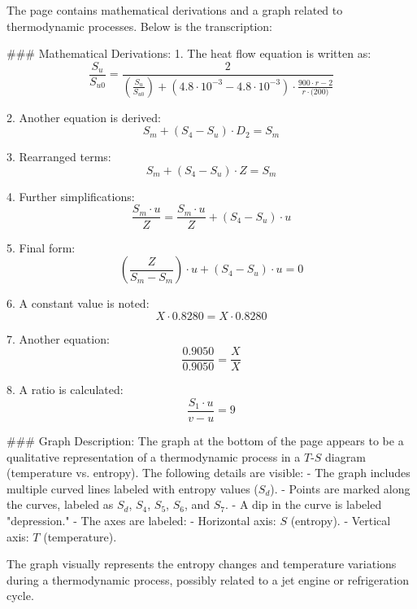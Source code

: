 The page contains mathematical derivations and a graph related to thermodynamic processes. Below is the transcription:

### Mathematical Derivations:
1. The heat flow equation is written as:
   \[
   \frac{S_u}{S_{u0}} = \frac{2}{\left(\frac{S_u}{S_{u0}}\right) + (4.8 \cdot 10^{-3} - 4.8 \cdot 10^{-3}) \cdot \frac{900 \cdot r - 2}{r \cdot \text{(200)}}}
   \]

2. Another equation is derived:
   \[
   S_m + (S_4 - S_u) \cdot D_2 = S_m
   \]

3. Rearranged terms:
   \[
   S_m + (S_4 - S_u) \cdot Z = S_m
   \]

4. Further simplifications:
   \[
   \frac{S_m \cdot u}{Z} = \frac{S_m \cdot u}{Z} + (S_4 - S_u) \cdot u
   \]

5. Final form:
   \[
   \left(\frac{Z}{S_m - S_m}\right) \cdot u + (S_4 - S_u) \cdot u = 0
   \]

6. A constant value is noted:
   \[
   X \cdot 0.8280 = X \cdot 0.8280
   \]

7. Another equation:
   \[
   \frac{0.9050}{0.9050} = \frac{X}{X}
   \]

8. A ratio is calculated:
   \[
   \frac{S_1 \cdot u}{v - u} = 9
   \]

### Graph Description:
The graph at the bottom of the page appears to be a qualitative representation of a thermodynamic process in a \( T \)-\( S \) diagram (temperature vs. entropy). The following details are visible:
- The graph includes multiple curved lines labeled with entropy values (\( S_d \)).
- Points are marked along the curves, labeled as \( S_d \), \( S_4 \), \( S_5 \), \( S_6 \), and \( S_7 \).
- A dip in the curve is labeled "depression."
- The axes are labeled:
  - Horizontal axis: \( S \) (entropy).
  - Vertical axis: \( T \) (temperature).

The graph visually represents the entropy changes and temperature variations during a thermodynamic process, possibly related to a jet engine or refrigeration cycle.